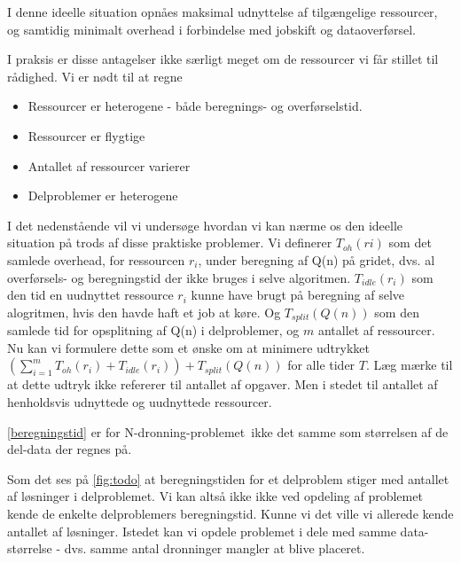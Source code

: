 \documentclass[pdf,draft,a4paper,11pt]{article}
\newcommand{\nq}{N-dronning-problemet}
\begin{document}
I denne ideelle situation opnåes maksimal udnyttelse af tilgængelige ressourcer, og samtidig minimalt overhead i forbindelse med jobskift og dataoverførsel.

I praksis er disse antagelser ikke særligt meget om de ressourcer vi får stillet til rådighed. Vi er nødt til at regne 
\begin{itemize}
	\item Ressourcer er heterogene - både beregnings- og overførselstid. 
	\item Ressourcer er flygtige
	\item Antallet af ressourcer varierer
	\item Delproblemer er heterogene
	\
\end{itemize}

I det nedenstående vil vi undersøge hvordan vi kan nærme os den ideelle situation på trods af disse praktiske problemer. Vi definerer  $T_{oh}(r{i})$ som det samlede overhead, for ressourcen $r_{i}$, under beregning af Q(n) på gridet, dvs. al overførsels- og beregningstid der ikke bruges i selve algoritmen. $T_{idle}(r_{i})$ som den tid en uudnyttet ressource $r_{i}$ kunne have brugt på beregning af selve alogritmen, hvis den havde haft et job at køre. Og $T_{split}(Q(n))$ som den samlede tid for opsplitning af Q(n) i delproblemer, og $m$ antallet af ressourcer. Nu kan vi formulere dette som et ønske om at minimere udtrykket $(\sum_{i=1}^{m}{T_{oh}(r_{i}) + T_{idle}(r_{i})}) + T_{split}(Q(n))$ for alle tider $T$. Læg mærke til at dette udtryk ikke refererer til antallet af opgaver. Men i stedet til antallet af henholdsvis udnyttede og uudnyttede ressourcer.  

\ref{beregningstid} er for \nq\ ikke det samme som størrelsen af de del-data der regnes på. 

Som det ses på \ref{fig:todo} at beregningstiden for et delproblem stiger med antallet af løsninger i delproblemet. Vi kan altså ikke ikke ved opdeling af problemet kende de enkelte delproblemers beregningstid. Kunne vi det ville vi allerede kende antallet af løsninger. Istedet kan vi opdele problemet i dele med samme data-størrelse - dvs. samme antal dronninger mangler at blive placeret. 

  
\end{document}
